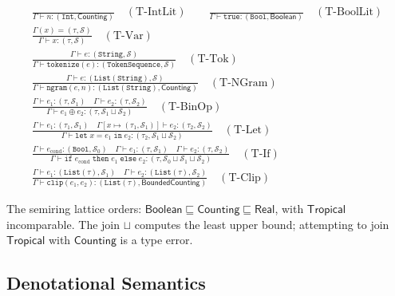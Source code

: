 \documentclass[11pt]{article}
\newcommand{\semiring}[1]{\mathcal{#1}}
\begin{document}
\begin{gather}
\frac{}{\Gamma \vdash n : (\texttt{Int}, \mathsf{Counting})} \quad (\text{T-IntLit})
\qquad
\frac{}{\Gamma \vdash \texttt{true} : (\texttt{Bool}, \mathsf{Boolean})} \quad (\text{T-BoolLit})
\\[6pt]
\frac{\Gamma(x) = (\tau, \semiring{S})}
     {\Gamma \vdash x : (\tau, \semiring{S})} \quad (\text{T-Var})
\\[6pt]
\frac{\Gamma \vdash e : (\texttt{String}, \semiring{S})}
     {\Gamma \vdash \texttt{tokenize}(e) : (\texttt{TokenSequence}, \semiring{S})}
  \quad (\text{T-Tok})
\\[6pt]
\frac{\Gamma \vdash e : (\texttt{List}(\texttt{String}), \semiring{S})}
     {\Gamma \vdash \texttt{ngram}(e, n) : (\texttt{List}(\texttt{String}), \mathsf{Counting})}
  \quad (\text{T-NGram})
\\[6pt]
\frac{\Gamma \vdash e_1 : (\tau, \semiring{S}_1) \quad
      \Gamma \vdash e_2 : (\tau, \semiring{S}_2)}
     {\Gamma \vdash e_1 \oplus e_2 : (\tau, \semiring{S}_1 \sqcup \semiring{S}_2)}
  \quad (\text{T-BinOp})
\\[6pt]
\frac{\Gamma \vdash e_1 : (\tau_1, \semiring{S}_1) \quad
      \Gamma[x \mapsto (\tau_1, \semiring{S}_1)] \vdash e_2 : (\tau_2, \semiring{S}_2)}
     {\Gamma \vdash \texttt{let}\;x = e_1\;\texttt{in}\;e_2 : (\tau_2, \semiring{S}_1 \sqcup \semiring{S}_2)}
  \quad (\text{T-Let})
\\[6pt]
\frac{\Gamma \vdash e_{\text{cond}} : (\texttt{Bool}, \semiring{S}_0) \quad
      \Gamma \vdash e_1 : (\tau, \semiring{S}_1) \quad
      \Gamma \vdash e_2 : (\tau, \semiring{S}_2)}
     {\Gamma \vdash \texttt{if}\;e_{\text{cond}}\;\texttt{then}\;e_1\;\texttt{else}\;e_2 : (\tau, \semiring{S}_0 \sqcup \semiring{S}_1 \sqcup \semiring{S}_2)}
  \quad (\text{T-If})
\\[6pt]
\frac{\Gamma \vdash e_1 : (\texttt{List}(\tau), \semiring{S}_1) \quad
      \Gamma \vdash e_2 : (\texttt{List}(\tau), \semiring{S}_2)}
     {\Gamma \vdash \texttt{clip}(e_1, e_2) : (\texttt{List}(\tau), \mathsf{BoundedCounting})}
  \quad (\text{T-Clip})
\end{gather}

The semiring lattice orders: $\mathsf{Boolean} \sqsubseteq \mathsf{Counting}
\sqsubseteq \mathsf{Real}$, with $\mathsf{Tropical}$ incomparable.
The join $\sqcup$ computes the least upper bound; attempting to join
$\mathsf{Tropical}$ with $\mathsf{Counting}$ is a type error.

\subsection{Denotational Semantics}
\end{document}
